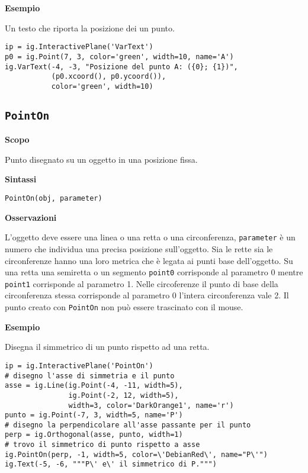 \textbf{Esempio}

Un testo che riporta la posizione dei un punto.

\begin{lstlisting}
ip = ig.InteractivePlane('VarText')
p0 = ig.Point(7, 3, color='green', width=10, name='A')
ig.VarText(-4, -3, "Posizione del punto A: ({0}; {1})",
           (p0.xcoord(), p0.ycoord()),
           color='green', width=10)
\end{lstlisting}


\subsection{\texttt{PointOn}}
\label{sub:geoint_pointon}
\textbf{Scopo}

Punto disegnato su un oggetto in una posizione fissa.

\textbf{Sintassi}

\begin{lstlisting}
PointOn(obj, parameter)
\end{lstlisting}

\textbf{Osservazioni}

L'oggetto deve essere una linea o una retta o una circonferenza,
\texttt{parameter} è un numero che individua una precisa posizione sull'oggetto.
Sia le rette sia le circonferenze hanno una loro metrica che è legata ai punti
base dell'oggetto. Su una retta una semiretta o un segmento \texttt{point0}
corrisponde al parametro 0 mentre \texttt{point1} corrisponde al parametro 1.
Nelle circoferenze il punto di base della circonferenza stessa corrisponde
al parametro 0 l'intera circonferenza vale 2.
Il punto creato con \texttt{PointOn} non può essere trascinato con il mouse.

\textbf{Esempio}

Disegna il simmetrico di un punto rispetto ad una retta.

\begin{lstlisting}
ip = ig.InteractivePlane('PointOn')
# disegno l'asse di simmetria e il punto
asse = ig.Line(ig.Point(-4, -11, width=5), 
               ig.Point(-2, 12, width=5), 
               width=3, color='DarkOrange1', name='r')
punto = ig.Point(-7, 3, width=5, name='P')
# disegno la perpendicolare all'asse passante per il punto
perp = ig.Orthogonal(asse, punto, width=1)
# trovo il simmetrico di punto rispetto a asse
ig.PointOn(perp, -1, width=5, color=\'DebianRed\', name="P\'")
ig.Text(-5, -6, """P\' e\' il simmetrico di P.""")
\end{lstlisting}


